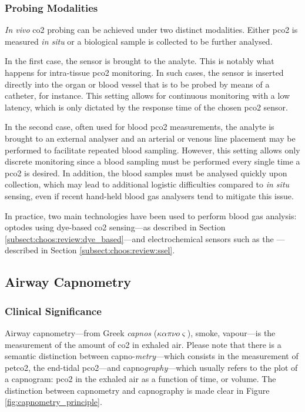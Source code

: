 \subsubsection{Probing Modalities}

\textit{In vivo} \gls{co2} probing can be achieved under two distinct modalities. Either \gls{pco2} is measured \textit{in situ} or a biological sample is collected to be further analysed.

In the first case, the sensor is brought to the analyte. This is notably what happens for intra-tissue \gls{pco2} monitoring. In such cases, the sensor is inserted directly into the organ or blood vessel that is to be probed by means of a catheter, for instance. This setting allows for continuous monitoring with a low latency, which is only dictated by the response time of the chosen \gls{pco2} sensor\cite{ganter2003}.

In the second case, often used for blood \gls{pco2} measurements, the analyte is brought to an external analyser and an arterial or venous line placement may be performed to facilitate repeated blood sampling. However, this setting allows only discrete monitoring since a blood sampling must be performed every single time a \gls{pco2} is desired. In addition, the blood samples must be analysed quickly upon collection, which may lead to additional logistic difficulties compared to \textit{in situ} sensing\cite{nanji1984}, even if recent hand-held blood gas analysers tend to mitigate this issue\cite{luukkonen2016}.

In practice, two main technologies have been used to perform blood gas analysis: optodes using dye-based \gls{co2} sensing---as described in Section \ref{subsect:choos:review:dye_based}\cite{ganter2003, menzel2003}---and electrochemical sensors such as the \ssel{}---described in Section \ref{subsect:choos:review:ssel}\cite{badnjevic2011}.

\subsection{Airway Capnometry}\label{subsect:airway_cap}

\subsubsection{Clinical Significance}\label{subsect:airway_capno_cc}

Airway capnometry---from Greek \textit{capnos} ($\kappa\alpha\pi\nu o \varsigma$), smoke, vapour---is the measurement of the amount of \gls{co2} in exhaled air. Please note that there is a semantic distinction between capno-\emph{metry}---which consists in the measurement of \gls{petco2}, the end-tidal \gls{pco2}---and capno\emph{graphy}---which usually refers to the plot of a capnogram: \gls{pco2} in the exhaled air as a function of time, or volume. The distinction between capnometry and capnography is made clear in Figure \ref{fig:capnometry_principle}.%

